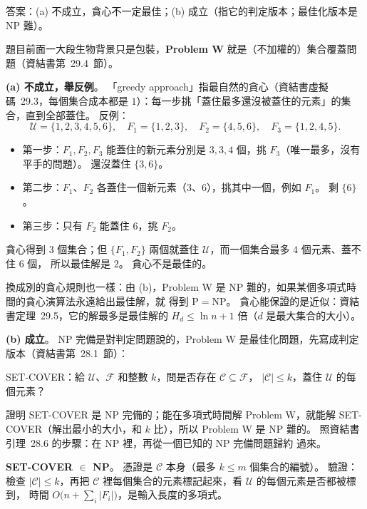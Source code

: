 \begin{pastsoln}
答案：(a) 不成立，貪心不一定最佳；(b) 成立（指它的判定版本；最佳化版本是 NP 難）。

題目前面一大段生物背景只是包裝，\textbf{Problem W} 就是（不加權的）集合覆蓋問題（資結書第~29.4~節）。

\textbf{(a) 不成立，舉反例}。 「greedy approach」指最自然的貪心（資結書虛擬碼~29.3，每個集合成本都是
$1$）：每一步挑「蓋住最多還沒被蓋住的元素」的集合，直到全部蓋住。 反例：
\[
\mathcal{U} = \{1, 2, 3, 4, 5, 6\},\quad F_1 = \{1, 2, 3\},\quad F_2 = \{4, 5, 6\},\quad F_3 = \{1, 2, 4, 5\}.
\]
\begin{itemize}
\item 第一步：$F_1, F_2, F_3$ 能蓋住的新元素分別是 $3, 3, 4$ 個，挑 $F_3$（唯一最多，沒有平手的問題）。
還沒蓋住 $\{3, 6\}$。
\item 第二步：$F_1$、$F_2$ 各蓋住一個新元素（$3$、$6$），挑其中一個，例如 $F_1$。 剩 $\{6\}$。
\item 第三步：只有 $F_2$ 能蓋住 $6$，挑 $F_2$。
\end{itemize}
貪心得到 $3$ 個集合；但 $\{F_1, F_2\}$ 兩個就蓋住 $\mathcal{U}$，而一個集合最多 $4$ 個元素、蓋不住 $6$ 個，
所以最佳解是 $2$。 貪心不是最佳的。

換成別的貪心規則也一樣：由 (b)，Problem W 是 NP 難的，如果某個多項式時間的貪心演算法永遠給出最佳解，就
得到 $\mathrm{P} = \mathrm{NP}$。 貪心能保證的是近似：資結書定理~29.5，它的解最多是最佳解的 $H_d \le
\ln n + 1$ 倍（$d$ 是最大集合的大小）。

\textbf{(b) 成立}。 NP 完備是對判定問題說的，Problem W 是最佳化問題，先寫成判定版本（資結書第~28.1~節）：

\begin{center}
SET-COVER：給 $\mathcal{U}$、$\mathcal{F}$ 和整數 $k$，問是否存在 $\mathcal{C} \subseteq \mathcal{F}$，
$|\mathcal{C}| \le k$，蓋住 $\mathcal{U}$ 的每個元素？
\end{center}
證明 SET-COVER 是 NP 完備的；能在多項式時間解 Problem W，就能解 SET-COVER（解出最小的大小，和 $k$
比），所以 Problem W 是 NP 難的。 照資結書引理~28.6 的步驟：在 NP 裡，再從一個已知的 NP 完備問題歸約
過來。

\textbf{SET-COVER $\in$ NP}。 憑證是 $\mathcal{C}$ 本身（最多 $k \le m$ 個集合的編號）。 驗證：檢查
$|\mathcal{C}| \le k$，再把 $\mathcal{C}$ 裡每個集合的元素標記起來，看 $\mathcal{U}$ 的每個元素是否都被標到，
時間 $O\bigl(n + \sum_i |F_i|\bigr)$，是輸入長度的多項式。


\end{pastsoln}
